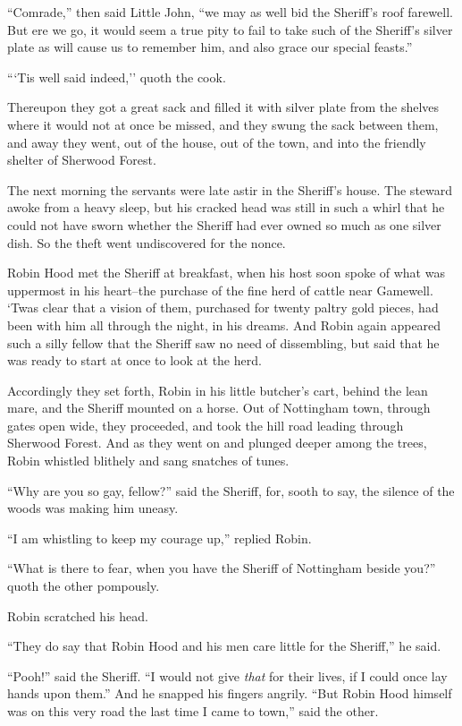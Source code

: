 ``Comrade,'' then said Little John, ``we may as well bid the Sheriff's
roof farewell. But ere we go, it would seem a true pity to fail to take
such of the Sheriff's silver plate as will cause us to remember him, and
also grace our special feasts.''

```Tis well said indeed,'' quoth the cook.

Thereupon they got a great sack and filled it with silver plate from the
shelves where it would not at once be missed, and they swung the sack
between them, and away they went, out of the house, out of the town, and
into the friendly shelter of Sherwood Forest.

The next morning the servants were late astir in the Sheriff's house.
The steward awoke from a heavy sleep, but his cracked head was still in
such a whirl that he could not have sworn whether the Sheriff had ever
owned so much as one silver dish. So the theft went undiscovered for the
nonce.

Robin Hood met the Sheriff at breakfast, when his host soon spoke of
what was uppermost in his heart--the purchase of the fine herd of cattle
near Gamewell. `Twas clear that a vision of them, purchased for twenty
paltry gold pieces, had been with him all through the night, in his
dreams. And Robin again appeared such a silly fellow that the Sheriff
saw no need of dissembling, but said that he was ready to start at once
to look at the herd.

Accordingly they set forth, Robin in his little butcher's cart, behind
the lean mare, and the Sheriff mounted on a horse. Out of Nottingham
town, through gates open wide, they proceeded, and took the hill road
leading through Sherwood Forest. And as they went on and plunged deeper
among the trees, Robin whistled blithely and sang snatches of tunes.

``Why are you so gay, fellow?'' said the Sheriff, for, sooth to say, the
silence of the woods was making him uneasy.

``I am whistling to keep my courage up,'' replied Robin.

``What is there to fear, when you have the Sheriff of Nottingham beside
you?'' quoth the other pompously.

Robin scratched his head.

``They do say that Robin Hood and his men care little for the Sheriff,''
he said.

``Pooh!'' said the Sheriff. ``I would not give \emph{that} for their
lives, if I could once lay hands upon them.'' And he snapped his fingers
angrily. ``But Robin Hood himself was on this very road the last time I
came to town,'' said the other.

